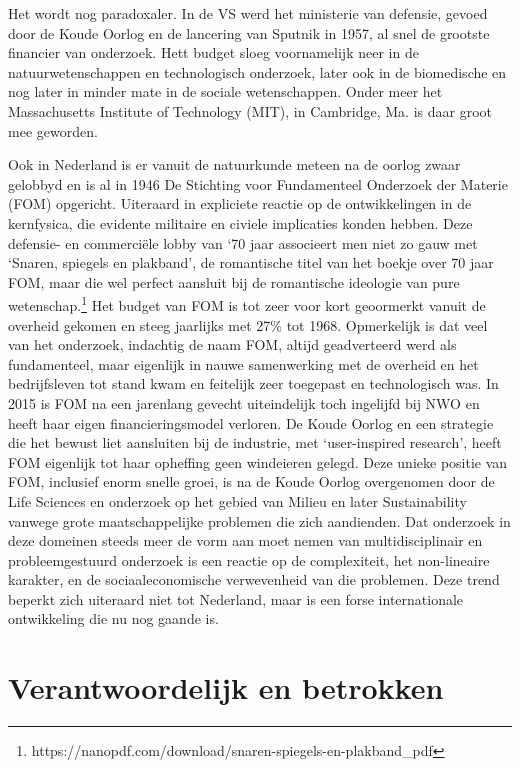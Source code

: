 \documentclass[empirical, authordate, ]{new-jote-article}
\begin{document}
	Het wordt nog paradoxaler. In de VS werd het ministerie van defensie, gevoed door de Koude Oorlog en de lancering van Sputnik in 1957, al snel de grootste financier van onderzoek. Hett budget sloeg voornamelijk neer in de natuurwetenschappen en technologisch onderzoek, later ook in de biomedische en nog later in minder mate in de sociale wetenschappen. Onder meer het Massachusetts Institute of Technology (MIT), in Cambridge, Ma. is daar groot mee geworden.



	Ook in Nederland is er vanuit de natuurkunde meteen na de oorlog zwaar gelobbyd en is al in 1946 De Stichting voor Fundamenteel Onderzoek der Materie (FOM) opgericht. Uiteraard in expliciete reactie op de ontwikkelingen in de kernfysica, die evidente militaire en civiele implicaties konden hebben. Deze defensie- en commerciële lobby van ‘70 jaar associeert men niet zo gauw met ‘Snaren, spiegels en plakband', de romantische titel van het boekje over 70 jaar FOM, maar die wel perfect aansluit bij de romantische ideologie van pure wetenschap.\footnote{https://nanopdf.com/download/snaren-spiegels-en-plakband\_pdf} Het budget van FOM is tot zeer voor kort geoormerkt vanuit de overheid gekomen en steeg jaarlijks met 27\% tot 1968. Opmerkelijk is dat veel van het onderzoek, indachtig de naam FOM, altijd geadverteerd werd als fundamenteel, maar eigenlijk in nauwe samenwerking met de overheid en het bedrijfsleven tot stand kwam en feitelijk zeer toegepast en technologisch was. In 2015 is FOM na een jarenlang gevecht uiteindelijk toch ingelijfd bij NWO en heeft haar eigen financieringsmodel verloren. De Koude Oorlog en een strategie die het bewust liet aansluiten bij de industrie, met ‘user-inspired research', heeft FOM eigenlijk tot haar opheffing geen windeieren gelegd. Deze unieke positie van FOM, inclusief enorm snelle groei, is na de Koude Oorlog overgenomen door de Life Sciences en onderzoek op het gebied van Milieu en later Sustainability vanwege grote maatschappelijke problemen die zich aandienden. Dat onderzoek in deze domeinen steeds meer de vorm aan moet nemen van multidisciplinair en probleemgestuurd onderzoek is een reactie op de complexiteit, het non-lineaire karakter, en de sociaaleconomische verwevenheid van die problemen. Deze trend beperkt zich uiteraard niet tot Nederland, maar is een forse internationale ontwikkeling die nu nog gaande is.



	\section{Verantwoordelijk en betrokken}
\end{document}
